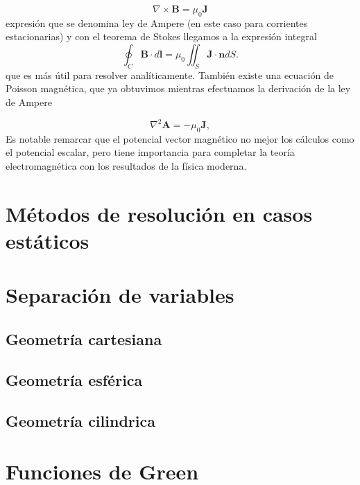 \documentclass[11pt,a4paper]{article}
\numberwithin{equation}{section}
\begin{document}
\begin{equation}
    \nabla \times \textbf{B} = \mu_0 \textbf{J}
    \label{eq:m_ampere_dif}
\end{equation}
expresión que se denomina ley de Ampere (en este caso para corrientes estacionarias) y con el teorema de Stokes llegamos a la expresión integral
\begin{equation}
    \oint_{C} \textbf{B} \cdot d\textbf{l} = \mu_0 \iint_{S} \textbf{J} \cdot \textbf{n} dS.
    \label{eq:m_ampere_int}
\end{equation}
que es más útil para resolver analíticamente. También existe una ecuación de Poisson magnética, que ya obtuvimos mientras efectuamos la derivación de la ley de Ampere

\begin{equation}
    \nabla^2\textbf{A} = -\mu_0 \textbf{J},
    \label{eq:m_poisson}
\end{equation}
Es notable remarcar que el potencial vector magnético no mejor los cálculos como el potencial escalar, pero tiene importancia para completar la teoría electromagnética con los resultados de la física moderna.


\section{Métodos de resolución en casos estáticos}

\section{Separación de variables}

\subsection{Geometría cartesiana}

\subsection{Geometría esférica}

\subsection{Geometría cilindrica}

\section{Funciones de Green}
\end{document}
